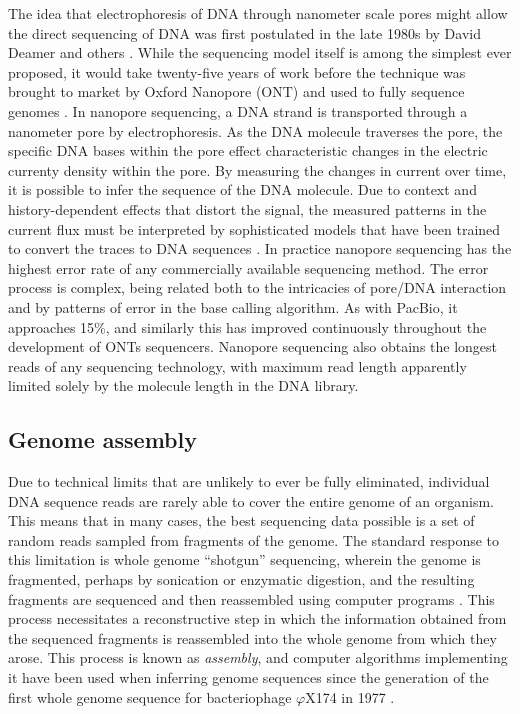 The idea that electrophoresis of DNA through nanometer scale pores might allow the direct sequencing of DNA was first postulated in the late 1980s by David Deamer and others \cite{deamer2016three}.
While the sequencing model itself is among the simplest ever proposed, it would take twenty-five years of work \cite{kasianowicz1996characterization,purnell2008nucleotide} before the technique was brought to market by Oxford Nanopore (ONT) \cite{mikheyev2014first} and used to fully sequence genomes \cite{loman2015complete, jain2018nanopore}.
In nanopore sequencing, a DNA strand is transported through a nanometer pore by electrophoresis.
As the DNA molecule traverses the pore, the specific DNA bases within the pore effect characteristic changes in the electric currenty density within the pore.
By measuring the changes in current over time, it is possible to infer the sequence of the DNA molecule.
Due to context and history-dependent effects that distort the signal, the measured patterns in the current flux must be interpreted by sophisticated models that have been trained to convert the traces to DNA sequences \cite{david2016nanocall}.
In practice nanopore sequencing has the highest error rate of any commercially available sequencing method.
The error process is complex, being related both to the intricacies of pore/DNA interaction and by patterns of error in the base calling algorithm.
As with PacBio, it approaches 15\%, and similarly this has improved continuously throughout the development of ONTs sequencers.
Nanopore sequencing also obtains the longest reads of any sequencing technology, with maximum read length apparently limited solely by the molecule length in the DNA library.


\subsection{Genome assembly}
\label{sec:genome_assembly}

Due to technical limits that are unlikely to ever be fully eliminated, individual DNA sequence reads are rarely able to cover the entire genome of an organism.
This means that in many cases, the best sequencing data possible is a set of random reads sampled from fragments of the genome. 
The standard response to this limitation is whole genome ``shotgun'' sequencing, wherein the genome is fragmented, perhaps by sonication or enzymatic digestion, and the resulting fragments are sequenced and then reassembled using computer programs \cite{gardner1981complete, sanger1982nucleotide}.
This process necessitates a reconstructive step in which the information obtained from the sequenced fragments is reassembled into the whole genome from which they arose.
This process is known as \emph{assembly}, and computer algorithms implementing it have been used when inferring genome sequences since the generation of the first whole genome sequence for bacteriophage $\varphi$X174 in 1977 \cite{sanger1977nucleotide, staden1979strategy}.


